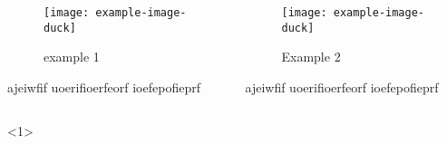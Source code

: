 \documentclass{beamer}
\begin{document}
  \begin{frame}

    \begin{columns}

        \begin{column}{5cm}
            \begin{figure}
                \texttt{[image: example-image-duck]}
                \vspace*{-0.45cm}
                \caption{example 1}
            \end{figure}
            \vspace*{-0.3cm}
            ajeiwfif uoerifioerfeorf ioefepofieprf 
        \end{column}

        \hfill

        \begin{column}{5cm}
            \begin{figure}
                \texttt{[image: example-image-duck]}
                \vspace*{-0.45cm}
                \caption{Example 2}
            \end{figure}
            \vspace*{-0.3cm}
            ajeiwfif uoerifioerfeorf ioefepofieprf 
        \end{column}

    \end{columns}

        \begin{onlyenv}<1>
        \end{onlyenv} 

        \pause    

  \end{frame}
\end{document}
